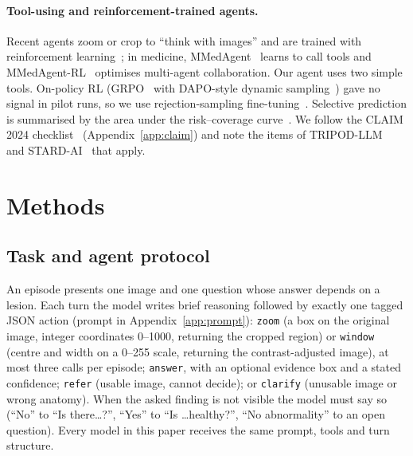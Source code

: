 \documentclass[11pt]{article}
\begin{document}
\paragraph{Tool-using and reinforcement-trained agents.} Recent agents zoom or crop to ``think with images'' and are trained with reinforcement learning~\cite{deepeyes,pixelreasoner}; in medicine, MMedAgent~\cite{mmedagent} learns to call tools and MMedAgent-RL~\cite{mmedagentrl} optimises multi-agent collaboration. Our agent uses two simple tools. On-policy RL (GRPO~\cite{grpo} with DAPO-style dynamic sampling~\cite{dapo}) gave no signal in pilot runs, so we use rejection-sampling fine-tuning~\cite{star,rft}. Selective prediction is summarised by the area under the risk--coverage curve~\cite{aurc}. We follow the CLAIM 2024 checklist~\cite{claim} (Appendix~\ref{app:claim}) and note the items of TRIPOD-LLM~\cite{tripodllm} and STARD-AI~\cite{stardai} that apply.

\section{Methods}

\subsection{Task and agent protocol}
An episode presents one image and one question whose answer depends on a lesion. Each turn the model writes brief reasoning followed by exactly one tagged JSON action (prompt in Appendix~\ref{app:prompt}): \texttt{zoom} (a box on the original image, integer coordinates 0--1000, returning the cropped region) or \texttt{window} (centre and width on a 0--255 scale, returning the contrast-adjusted image), at most three calls per episode; \texttt{answer}, with an optional evidence box and a stated confidence; \texttt{refer} (usable image, cannot decide); or \texttt{clarify} (unusable image or wrong anatomy). When the asked finding is not visible the model must say so (``No'' to ``Is there\dots?'', ``Yes'' to ``Is \dots healthy?'', ``No abnormality'' to an open question). Every model in this paper receives the same prompt, tools and turn structure.
\end{document}
